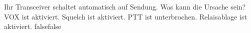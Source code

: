     {Ihr Transceiver schaltet automatisch auf Sendung. Was kann die Ursache sein?}
    {VOX ist aktiviert.}
    {Squelch ist aktiviert.}
    {PTT ist unterbrochen.}
    {Relaisablage ist aktiviert.}
    {false}{false}